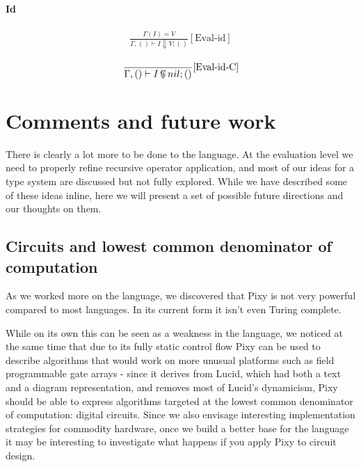\documentclass{scrartcl}
\DeclareMathOperator{\ceval}{\overset{C}{\smash{\Downarrow}}}
\begin{document}
    \paragraph{Id}
    
    \begin{align*}
    \frac{
        \Gamma(I) = V
    }{
        \Gamma, () \vdash I \Downarrow V; ()
    }[\text{Eval-id}]
    \end{align*}
    
    \begin{align*}
    \frac{}{
        \Gamma, () \vdash I \ceval nil; ()
    }[\text{Eval-id-C}]
    \end{align*}
    
    \section{Comments and future work}
    
    There is clearly a lot more to be done to the language. At the evaluation level we need to properly refine recursive operator application, and most of our ideas for a type system are discussed but not fully explored. While we have described some of these ideas inline, here we will present a set of possible future directions and our thoughts on them.
    
    \subsection{Circuits and lowest common denominator of computation}
    
    As we worked more on the language, we discovered that Pixy is not very powerful compared to most languages. In its current form it isn't even Turing complete.
    
    While on its own this can be seen as a weakness in the language, we noticed at the same time that due to its fully static control flow Pixy can be used to describe algorithms that would work on more unusual platforms such as field programmable gate arrays - since it derives from Lucid, which had both a text and a diagram representation, and removes most of Lucid's dynamicism, Pixy should be able to express algorithms targeted at the lowest common denominator of computation: digital circuits. Since we also envisage interesting implementation strategies for commodity hardware, once we build a better base for the language it may be interesting to investigate what happens if you apply Pixy to circuit design.
    
\end{document}
